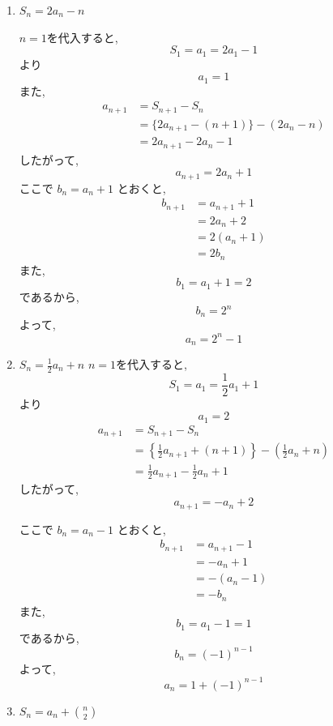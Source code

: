     \noindent{}
    \begin{enumerate}[label=(\arabic*),parsep=3pt,format=\bookitemlink{example-summation-1}{solution}{problem}]
    \item $\displaystyle S_n=2a_n-n$

        $n=1$を代入すると,
        \[
          S_1=a_1=2a_1-1
        \]
        より
        \[
          a_1=1
        \]
        また,
        \begin{align*}
          a_{n+1}
            &=S_{n+1}-S_n\\
            &=\{2a_{n+1}-(n+1)\}-(2a_n-n)\\
            &=2a_{n+1}-2a_n-1
        \end{align*}
        したがって,
        \[
          a_{n+1}=2a_n+1
        \]
        ここで $b_n=a_n+1$ とおくと,
        \begin{align*}
          b_{n+1}
            &=a_{n+1}+1\\
            &=2a_n+2\\
            &=2(a_n+1)\\
            &=2b_n
        \end{align*}
        また,
        \[
          b_1=a_1+1=2
        \]
        であるから,
        \[
          b_n=2^n
        \]
        よって,
        \[
          a_n=2^n-1
        \]
    \item $\displaystyle S_n=\frac12a_n+n$
        $n=1$を代入すると,
        \[
          S_1=a_1=\frac12a_1+1
        \]
        より
        \[
          a_1=2
        \]
        \begin{align*}
          a_{n+1}
            &=S_{n+1}-S_n\\
            &=\left\{\frac12a_{n+1}+(n+1)\right\}-\left(\frac12a_n+n\right)\\
            &=\frac12a_{n+1}-\frac12a_n+1
        \end{align*}
        したがって,
        \[
          a_{n+1}=-a_n+2
        \]

        ここで $b_n=a_n-1$ とおくと,
        \begin{align*}
          b_{n+1}
            &=a_{n+1}-1\\
            &=-a_n+1\\
            &=-(a_n-1)\\
            &=-b_n
        \end{align*}
        また,
        \[
          b_1=a_1-1=1
        \]
        であるから,
        \[
          b_n=(-1)^{n-1}
        \]
        よって,
        \[
          a_n=1+(-1)^{n-1}
        \]
    \item $\displaystyle S_n=a_n+\binom n2$


\end{enumerate}
